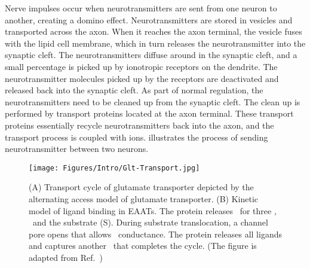 Nerve impulses occur when neurotransmitters are sent from one neuron to another, creating a 
domino effect. Neurotransmitters are stored in vesicles and transported across the axon. When 
it reaches the axon terminal, the vesicle fuses with the lipid cell membrane, which in turn 
releases the neurotransmitter into the synaptic cleft. The neurotransmitters diffuse around in 
the synaptic cleft, and a small percentage is picked up by ionotropic receptors on the dendrite. 
The neurotransmitter molecules picked up by the receptors are deactivated and released back 
into the synaptic cleft. As part of normal regulation, the neurotransmitters need to be cleaned 
up from the synaptic cleft. The clean up is performed by transport proteins located at the 
axon terminal. These transport proteins essentially recycle neurotransmitters back into the 
axon, and the transport process is coupled with ions.  illustrates the 
process of sending neurotransmitter between two neurons.

\begin{figure}[t!]
\centering
\texttt{[image: Figures/Intro/Glt-Transport.jpg]}
\caption{(A) Transport cycle of glutamate transporter depicted by the alternating 
access model of glutamate transporter. (B) Kinetic model of ligand binding in EAATs. 
The protein releases \K\ for three \Na, \Hi\ and the substrate (S). During substrate 
translocation, a channel pore opens that allows \Cl\ conductance. The protein releases 
all ligands and captures another \K\ that completes the cycle. (The figure is adapted 
from Ref.~\cite{Vandenberg2013})}
\label{intro:altmodel}
\end{figure}

